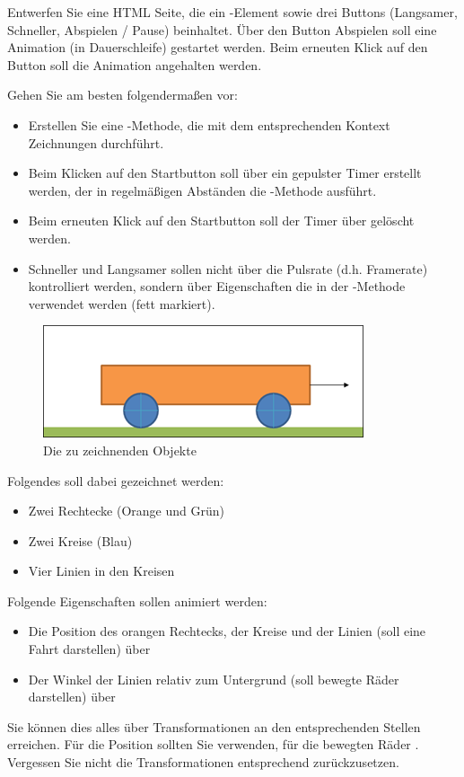 %
\par Entwerfen Sie eine HTML Seite, die ein -Element sowie drei
Buttons (Langsamer, Schneller, Abspielen / Pause) beinhaltet. Über den Button
Abspielen soll eine Animation (in Dauerschleife) gestartet werden. Beim
erneuten Klick auf den Button soll die Animation angehalten werden.
%
\par Gehen Sie am besten folgendermaßen vor:
%
\begin{itemize}
\item
Erstellen Sie eine -Methode, die mit dem entsprechenden
Kontext Zeichnungen durchführt.
\item
Beim Klicken auf den Startbutton soll über  ein gepulster
Timer erstellt werden, der in regelmäßigen Abständen die
-Methode ausführt.
\item
Beim erneuten Klick auf den Startbutton soll der Timer über
 gelöscht werden.
\item
Schneller und Langsamer sollen nicht über die Pulsrate (d.h. Framerate)
kontrolliert werden, sondern über Eigenschaften die in der
-Methode verwendet werden (fett markiert).
\end{itemize}
%
\begin{figure}[!h]
\centering
\includegraphics{Exercises/Figures/car.png}
\caption{Die zu zeichnenden Objekte}
\label{fig:car}
\end{figure}
%
\par Folgendes soll dabei gezeichnet werden:
%
\begin{itemize}
\item
Zwei Rechtecke (Orange und Grün)
\item
Zwei Kreise (Blau)
\item
Vier Linien in den Kreisen
\end{itemize}
%
\par Folgende Eigenschaften sollen animiert werden:
%
\begin{itemize}
\item
Die Position des orangen Rechtecks, der Kreise und der Linien (soll eine Fahrt
darstellen) über 
\item
Der Winkel der Linien relativ zum Untergrund (soll bewegte Räder darstellen)
über 
\end{itemize}
%
\par Sie können dies alles über Transformationen an den entsprechenden Stellen
erreichen. Für die Position sollten Sie  verwenden, für die
bewegten Räder . Vergessen Sie nicht die Transformationen
entsprechend zurückzusetzen.
